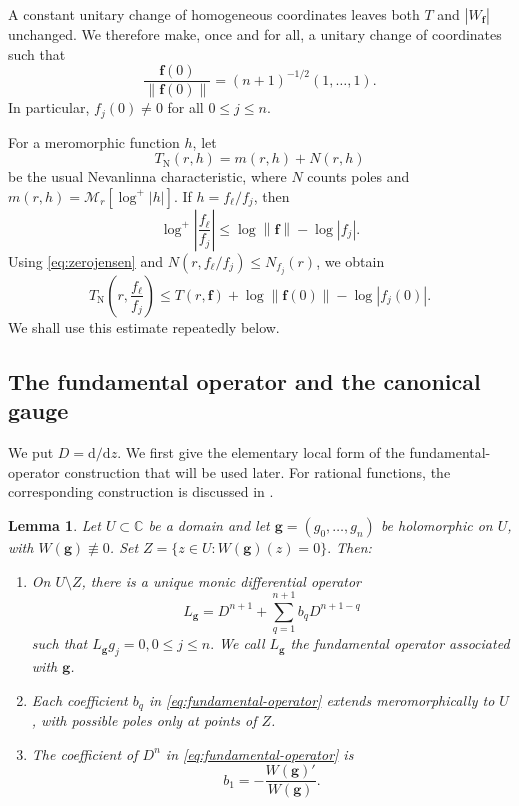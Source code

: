 \documentclass[12pt,letterpaper,reqno]{amsart}
\newtheorem{lem}[thm]{Lemma}
\theoremstyle{definition}
\numberwithin{equation}{section}
\newcommand{\C}{\mathbb C}
\newcommand{\NN}{N}
\newcommand{\TN}{T_{\mathrm N}}
\newcommand{\mean}[2]{\mathcal M_{#1}\!\left[#2\right]}
\newcommand{\norm}[1]{\left\lVert#1\right\rVert}
\newcommand{\fv}{\bm f}
\newcommand{\gv}{\bm g}
\begin{document}
A constant unitary change of homogeneous coordinates leaves both \(T\) and
\(|W_{\fv}|\) unchanged. We therefore make, once and for all, a unitary change
of coordinates such that
\[
\frac{\fv(0)}{\norm{\fv(0)}}=(n+1)^{-1/2}(1,\ldots,1).
\]
In particular, $
f_j(0)\ne0
$ for all $0\le j\le n$.

For a meromorphic function \(h\), let
\[
\TN(r,h)=m(r,h)+N(r,h)
\]
be the usual Nevanlinna characteristic, where \(N\) counts poles and
\(m(r,h)=\mean r{\log^+|h|}\). If \(h=f_\ell/f_j\), then
\[
\log^+\left|\frac{f_\ell}{f_j}\right|
 \leq \log\norm{\fv}-\log|f_j|.
\]
Using \eqref{eq:zerojensen} and
\(N(r,f_\ell/f_j)\leq\NN_{f_j}(r)\), we obtain
\begin{equation}\label{eq:quotientbound}
 \TN\!\left(r,\frac{f_\ell}{f_j}\right)
 \leq T(r,\fv)+\log\norm{\fv(0)}-\log|f_j(0)|.
\end{equation}
We shall use this estimate repeatedly below.


\subsection{The fundamental operator and the canonical gauge}


We put \(D=\mathrm d/\mathrm dz\). We first give the elementary local form of the fundamental-operator construction that will be used later. For rational functions, the corresponding construction is discussed in
\cite[Section~2, Proposition~2.2]{Pur23}.

\begin{lem}\label{lem:fundamental-operator}
Let \(U\subset\C\) be a domain and let
\(\gv=(g_0,\ldots,g_{n})\) be holomorphic on \(U\), with
\(W(\gv)\not\equiv0\). Set
$
Z=\{z\in U:W(\gv)(z)=0\}.
$
Then:
\begin{enumerate}[label=\textup{(\roman*)}]
\item On \(U\setminus Z\), there is a unique monic differential operator
\begin{equation}\label{eq:fundamental-operator}
L_{\gv}=D^{n+1}+\sum_{q=1}^{n+1}b_qD^{n+1-q}
\end{equation}
such that
$
L_{\gv}g_j=0, 0\le j\le n.
$ We call \(L_{\gv}\) the \emph{fundamental operator associated with
\(\gv\)}. 
\item Each coefficient \(b_q\) in \eqref{eq:fundamental-operator} extends meromorphically to \(U\), with possible
poles only at points of \(Z\).

\item The coefficient of \(D^{n}\)  in \eqref{eq:fundamental-operator}  is
$$
b_1=-\frac{W(\gv)'}{W(\gv)}.
$$
\end{enumerate}
\end{lem}
\end{document}
